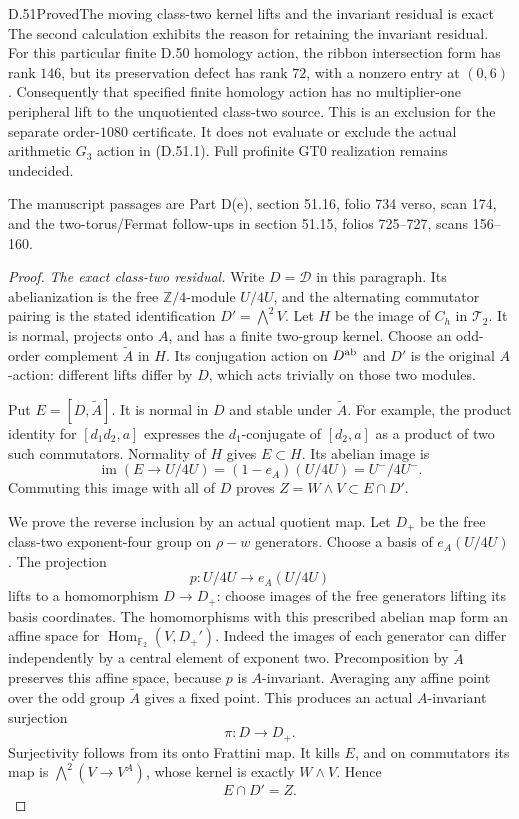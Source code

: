 \begin{statement}{D.51}{Proved}{The moving class-two kernel lifts and the invariant residual is exact}
The second calculation exhibits the reason for
retaining the invariant residual. For this particular
finite D.50 homology action, the ribbon intersection
form has rank \(146\), but its preservation defect
has rank \(72\), with a nonzero entry at \((0,6)\).
Consequently that specified finite homology action
has no multiplier-one peripheral lift to the
unquotiented class-two source. This is an exclusion
for the separate order-\(1080\) certificate. It does
not evaluate or exclude the actual arithmetic
\(G_3\) action in (D.51.1).
Full profinite GT0 realization remains undecided.

The manuscript passages are Part D(e), section 51.16,
folio 734 verso, scan 174, and the two-torus/Fermat
follow-ups in section 51.15, folios 725--727,
scans 156--160.
\end{statement}
\begin{proof}
\emph{The exact class-two residual.}
Write \(D=\mathcal D\) in this paragraph. Its abelianization
is the free \(\mathbb Z/4\)-module \(U/4U\), and the
alternating commutator pairing is the stated
identification \(D'=\bigwedge^2 V\).
Let \(H\) be the image of \(C_h\) in \(\mathcal T_2\).
It is normal, projects onto \(A\), and has a finite
two-group kernel. Choose an odd-order complement
\(\widetilde A\) in \(H\). Its conjugation action on
\(D^{\rm ab}\) and \(D'\) is the original \(A\)-action:
different lifts differ by \(D\), which acts trivially
on those two modules.

Put \(E=[D,\widetilde A]\). It is normal in \(D\)
and stable under \(\widetilde A\). For example,
the product identity for \([d_1d_2,a]\) expresses
the \(d_1\)-conjugate of \([d_2,a]\) as a product
of two such commutators. Normality of \(H\) gives
\(E\subset H\). Its abelian image is
\[
       \operatorname{im}(E\to U/4U)
           =(1-e_A)(U/4U)=U^-/4U^- .
 \tag{D.51.9}
\]
Commuting this image with all of \(D\) proves
\(Z=W\wedge V\subset E\cap D'\).

We prove the reverse inclusion by an actual quotient map.
Let \(D_+\) be the free class-two exponent-four group
on \(\rho-w\) generators. Choose a basis of
\(e_A(U/4U)\). The projection
\[
                p:U/4U\longrightarrow e_A(U/4U)
\]
lifts to a homomorphism \(D\to D_+\): choose images
of the free generators lifting its basis coordinates.
The homomorphisms with this prescribed abelian map
form an affine space for
\(\operatorname{Hom}_{\mathbb F_2}(V,D_+')\).
Indeed the images of each generator can differ
independently by a central element of exponent two.
Precomposition by \(\widetilde A\) preserves this
affine space, because \(p\) is \(A\)-invariant.
Averaging any affine point over the odd group
\(\widetilde A\) gives a fixed point. This produces
an actual \(A\)-invariant surjection
\[
                      \pi:D\longrightarrow D_+ .
 \tag{D.51.10}
\]
Surjectivity follows from its onto Frattini map.
It kills \(E\), and on commutators its map is
\(\bigwedge^2(V\to V^A)\), whose kernel is exactly
\(W\wedge V\). Hence
\[
                            E\cap D'=Z .
 \tag{D.51.11}
\]


\end{proof}
